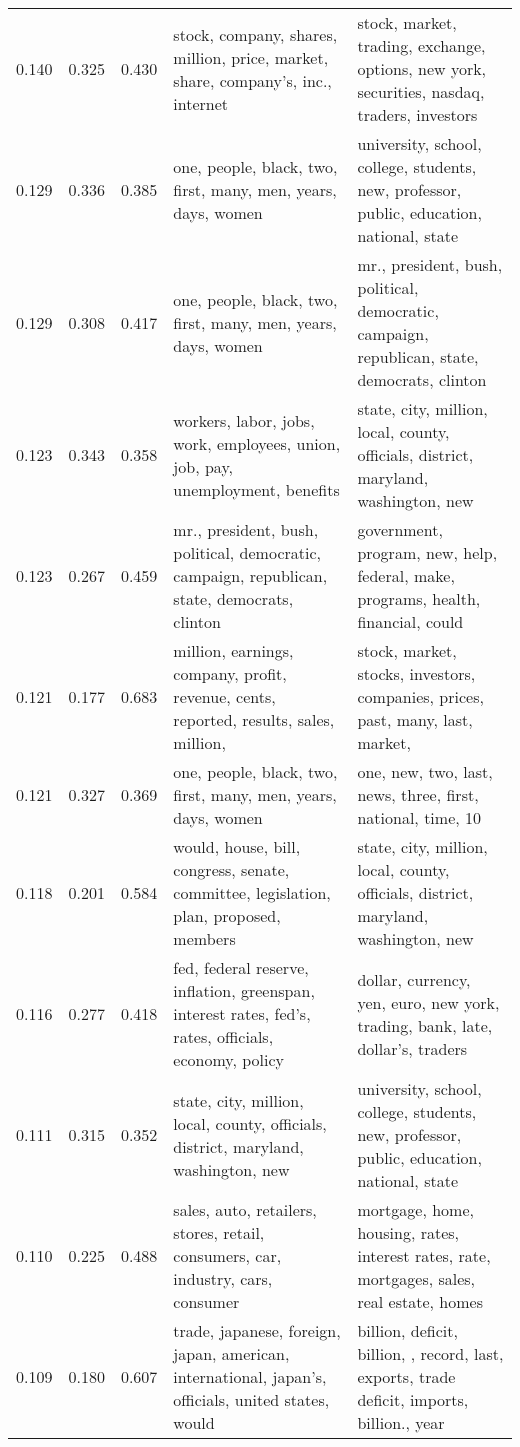 \begin{tabular}{cccp{5cm}p{5cm}}
0.140 & 0.325 & 0.430 & stock, company, shares, million, price, market, share, company's, inc., internet & stock, market, trading, exchange, options, new york, securities, nasdaq, traders, investors \\
0.129 & 0.336 & 0.385 & one, people, black, two, first, many, men, years, days, women & university, school, college, students, new, professor, public, education, national, state \\
0.129 & 0.308 & 0.417 & one, people, black, two, first, many, men, years, days, women & mr., president, bush, political, democratic, campaign, republican, state, democrats, clinton \\
0.123 & 0.343 & 0.358 & workers, labor, jobs, work, employees, union, job, pay, unemployment, benefits & state, city, million, local, county, officials, district, maryland, washington, new \\
0.123 & 0.267 & 0.459 & mr., president, bush, political, democratic, campaign, republican, state, democrats, clinton & government, program, new, help, federal, make, programs, health, financial, could \\
0.121 & 0.177 & 0.683 & million, earnings, company, profit, revenue, cents, reported, results, sales, million,  & stock, market, stocks, investors, companies, prices, past, many, last, market,  \\
0.121 & 0.327 & 0.369 & one, people, black, two, first, many, men, years, days, women & one, new, two, last, news, three, first, national, time, 10 \\
0.118 & 0.201 & 0.584 & would, house, bill, congress, senate, committee, legislation, plan, proposed, members & state, city, million, local, county, officials, district, maryland, washington, new \\
0.116 & 0.277 & 0.418 & fed, federal reserve, inflation, greenspan, interest rates, fed's, rates, officials, economy, policy & dollar, currency, yen, euro, new york, trading, bank, late, dollar's, traders \\
0.111 & 0.315 & 0.352 & state, city, million, local, county, officials, district, maryland, washington, new & university, school, college, students, new, professor, public, education, national, state \\
0.110 & 0.225 & 0.488 & sales, auto, retailers, stores, retail, consumers, car, industry, cars, consumer & mortgage, home, housing, rates, interest rates, rate, mortgages, sales, real estate, homes \\
0.109 & 0.180 & 0.607 & trade, japanese, foreign, japan, american, international, japan's, officials, united states, would & billion, deficit, billion, , record, last, exports, trade deficit, imports, billion., year \\

\end{tabular}
